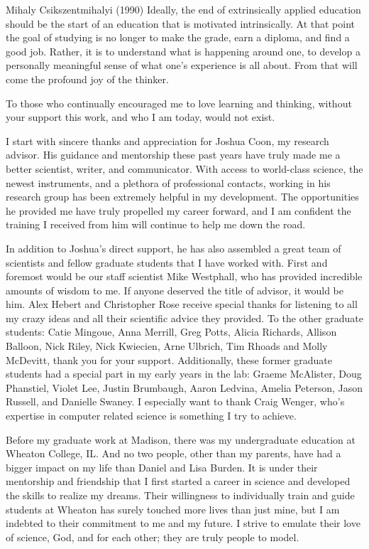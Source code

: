 \begin{wbepi}{Mihaly Csikszentmihalyi (1990)}
Ideally, the end of extrinsically applied education should be the start of an education that is motivated intrinsically. At that point the goal of studying is no longer to make the grade, earn a diploma, and find a good job. Rather, it is to understand what is happening around one, to develop a personally meaningful sense of what one's experience is all about. From that will come the profound joy of the thinker.
\end{wbepi}

To those who continually encouraged me to love learning and thinking, without your support this work, and who I am today, would not exist.

I start with sincere thanks and appreciation for Joshua Coon, my research advisor. His guidance and mentorship these past years have truly made me a better scientist, writer, and communicator. With access to world-class science, the newest instruments, and a plethora of professional contacts, working in his research group has been extremely helpful in my development. The opportunities he provided me have truly propelled my career forward, and I am confident the training I received from him will continue to help me down the road.

In addition to Joshua's direct support, he has also assembled a great team of scientists and fellow graduate students that I have worked with. First and foremost would be our staff scientist Mike Westphall, who has provided incredible amounts of wisdom to me. If anyone deserved the title of advisor, it would be him. Alex Hebert and Christopher Rose receive special thanks for listening to all my crazy ideas and all their scientific advice they provided. To the other graduate students: Catie Mingoue, Anna Merrill, Greg Potts, Alicia Richards, Allison Balloon, Nick Riley, Nick Kwiecien, Arne Ulbrich, Tim Rhoads and Molly McDevitt, thank you for your support. Additionally, these former graduate students had a special part in my early years in the lab: Graeme McAlister, Doug Phanstiel, Violet Lee, Justin Brumbaugh, Aaron Ledvina, Amelia Peterson, Jason Russell, and Danielle Swaney. I especially want to thank Craig Wenger, who's expertise in computer related science is something I try to achieve.

Before my graduate work at Madison, there was my undergraduate education at Wheaton College, IL. And no two people, other than my parents, have had a bigger impact on my life than Daniel and Lisa Burden. It is under their mentorship and friendship that I first started a career in science and developed the skills to realize my dreams. Their willingness to individually train and guide students at Wheaton has surely touched more lives than just mine, but I am indebted to their commitment to me and my future. I strive to emulate their love of science, God, and for each other; they are truly people to model.

